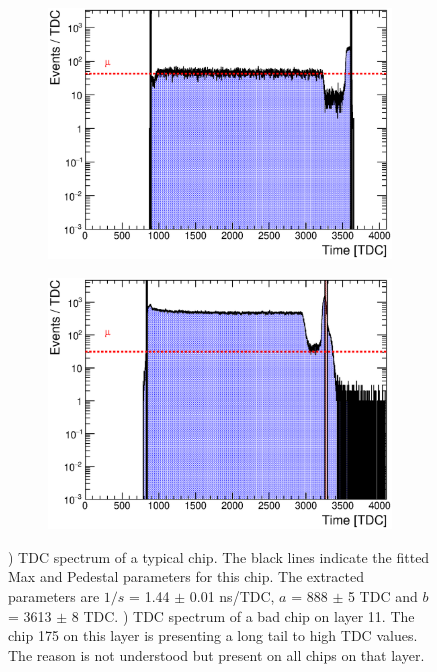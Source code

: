 \begin{figure}[htbp!]
	\begin{subfigure}[t]{0.49\textwidth}
		\centering
		\includegraphics[width=1\linewidth]{../Thesis_Plots/Timing/Muons/Plots/ExampleTDCSpectra.eps}
		\caption{} \label{fig:TDC_Spectrum}
	\end{subfigure}
	\hfill
	\begin{subfigure}[t]{0.49\textwidth}
		\centering
		\includegraphics[width=1\linewidth]{../Thesis_Plots/Timing/Muons/Plots/BadTDCSpectra_Layer11.eps}
		\caption{} \label{fig:TDC_Spectrum_bad}
	\end{subfigure}
	\caption{) TDC spectrum of a typical chip. The black lines indicate the fitted Max and Pedestal parameters for this chip. The extracted parameters are $1/s$ = 1.44 $\pm$ 0.01 ns/TDC, $a$ = 888 $\pm$ 5 TDC and $b$ = 3613 $\pm$ 8 TDC. ) TDC spectrum of a bad chip on layer 11. The chip 175 on this layer is presenting a long tail to high TDC values. The reason is not understood but present on all chips on that layer.}
\end{figure}

